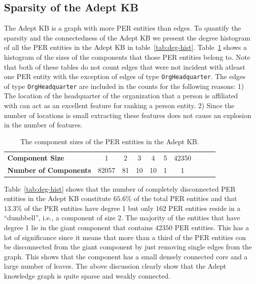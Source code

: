 \documentclass[paper=a4,fontsize=11pt]{scrartcl}
\newcommand{\ie}{i.e.,\xspace}
\newcommand{\tabref}[1]{table~\ref{#1}}
\newcommand{\Tabref}[1]{Table~\ref{#1}}
\numberwithin{equation}{section}    %
\numberwithin{figure}{section}      %
\numberwithin{table}{section}       %
\begin{document}
\subsection{Sparsity of the Adept KB}
\label{sec:graph-sparsity}
The Adept KB is a graph with more \textsc{PER} entities than edges.
To quantify the sparsity and the connectedness of the Adept KB we present
the degree histogram of all the \textsc{PER} entities in the Adept KB in \tabref{tab:deg-hist}. \Tabref{tab:hist-comp} shows a histogram of the sizes of the components that those \textsc{PER} entities belong to.
Note that both of these tables do not count edges that were not incident
with atleast one \textsc{PER} entity with the exception of edges of type
\texttt{OrgHeadquarter}. The edges of type \texttt{OrgHeadquarter} are
included in the counts for the following reasons:
1) The location of the headquarter of the organization that a person is affiliated
with can act as an excellent feature for ranking a person entity.
2) Since the number of locations is small extracting these features does not
cause an explosion in the number of features.
\begin{table}[htbp]
  \centering
  \caption{Table of degrees for the \textsc{PER} entities in the Adept KB.}
  \label{tab:deg-hist}
\end{table}

\begin{table}[htbp]
  \centering
  \begin{tabular}{l | c c c c c c c c c }
    \textbf{Component Size}     & 1     & 2  & 3  & 4  & 5 & 42350 \\
  \textbf{Number of Components} & 82057 & 81 & 10 & 10 & 1 & 1     \\
  \end{tabular}
  \caption{The component sizes of the \textsc{PER} entities in the Adept KB.}
  \label{tab:hist-comp}
\end{table}

\Tabref{tab:deg-hist} shows that the number of
completely disconnected \textsc{PER} entities in the Adept KB constitute $65.6\%$
of the total \textsc{PER} entities and that $13.3\%$ of the \textsc{PER}
entities have degree 1 but only $162$ \textsc{PER} entities reside in a ``dumbbell'', \ie a component of size $2$. The majority of the entities that have degree 1 lie in the
giant component that contains $42350$ \textsc{PER} entities. This has a lot of significance since it means that more than a third of the \textsc{PER} entities con be disconnected from the giant component by just removing single edges from the graph. This shows
that the component has a small densely connected core and a large number of leaves.
The above discussion clearly show that the Adept knowledge graph is quite sparse
and weakly connected.
\end{document}
